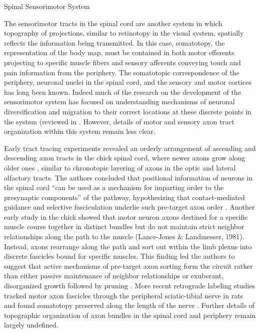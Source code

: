 Spinal Sensorimotor System 

The sensorimotor tracts in the spinal cord are another system in which topography of projections, similar to retinotopy in the visual system, spatially reflects the information being transmitted. 
In this case, somatotopy, the representation of the body map, must be contained in both motor efferents projecting to specific muscle fibers and sensory afferents conveying touch and pain information from the periphery. 
The somatotopic correspondence of the periphery, neuronal nuclei in the spinal cord, and the sensory and motor cortices has long been known. 
Indeed much of the research on the development of the sensorimotor system has focused on understanding mechanisms of neuronal diversification and migration to their correct locations at these discrete points in the system (reviewed in \cite{kania2014spinal}. 
However, details of motor and sensory axon tract organization within this system remain less clear. 

Early tract tracing experiments revealed an orderly arrangement of ascending and descending axon tracts in the chick spinal cord, where newer axons grow along older ones \cite{nornes1980pattern}, similar to chronotopic layering of axons in the optic and lateral olfactory tracts. 
The authors concluded that positional information of neurons in the spinal cord “can be used as a mechanism for imparting order to the presynaptic components” of the pathway, hypothesizing that contact-mediated guidance and selective fasciculation underlie such pre-target axon order \cite{nornes1980pattern}. 
Another early study in the chick showed that motor neuron axons destined for a specific muscle course together in distinct bundles but do not maintain strict neighbor relationships along the path to the muscle (Lance-Jones & Landmesser, 1981)\cite{lance1981pathway}. 
Instead, axons rearrange along the path and sort out within the limb plexus into discrete fascicles bound for specific muscles. 
This finding led the authors to suggest that active mechanisms of pre-target axon sorting form the circuit rather than either passive maintenance of neighbor relationships or exuberant, disorganized growth followed by pruning \cite{lance1981pathway}. 
More recent retrograde labeling studies tracked motor axon fascicles through the peripheral sciatic-tibial nerve in rats and found somatotopy preserved along the length of the nerve \cite{badia2010topographical}. 
Further details of topographic organization of axon bundles in the spinal cord and periphery remain largely undefined.

